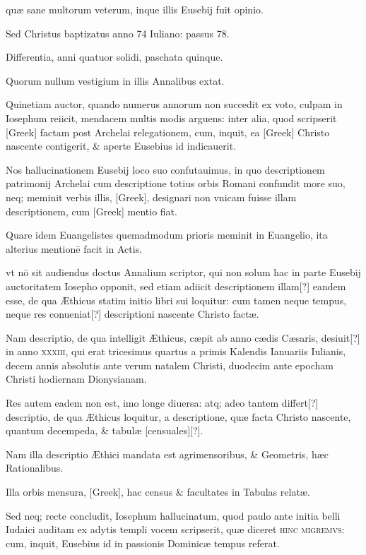 \begin{parnumbers}
quæ sane multorum veterum, inque illis Eusebij fuit opinio.

Sed
Christus baptizatus anno 74 Iuliano: passus 78.

Differentia, anni
quatuor solidi, paschata quinque.

Quorum nullum vestigium in illis
Annalibus extat.

Quinetiam auctor, quando numerus annorum
non succedit ex voto, culpam in Iosephum reiicit, mendacem multis
modis arguens: inter alia, quod scripserit \textgreek{[Greek]} factam post
Archelai relegationem, cum, inquit, ea \textgreek{[Greek]} Christo nascente
contigerit, \& aperte Eusebius id indicauerit.

Nos hallucinationem
Eusebij loco suo confutauimus, in quo descriptionem patrimonij
Archelai cum descriptione totius orbis Romani confundit more
suo, neq; meminit verbis illis, \textgreek{[Greek]}, designari non
vnicam fuisse illam descriptionem, cum \textgreek{[Greek]} mentio fiat.

Quare
idem Euangelistes quemadmodum prioris meminit in Euangelio,
ita alterius mentionē facit in Actis.

vt nō sit audiendus doctus Annalium
scriptor, qui non solum hac in parte Eusebij auctoritatem
Iosepho opponit, sed etiam adiicit descriptionem illam[?] eandem esse,
de qua Æthicus statim initio libri sui loquitur: cum tamen neque
tempus, neque res conueniat[?] descriptioni nascente Christo factæ.

Nam descriptio, de qua intelligit Æthicus, cæpit ab anno cædis
Cæsaris, desiuit[?] in anno \textsc{xxxiii},
 qui erat tricesimus quartus a primis
Kalendis Ianuariis Iulianis, decem annis absolutis ante verum
natalem Christi, duodecim ante epocham Christi hodiernam Dionysianam.

Res autem eadem non est, imo longe diuersa: atq; adeo
tantem differt[?] descriptio, de qua Æthicus loquitur, a descriptione,
quæ facta Christo nascente, quantum decempeda, \& tabulæ [censuales][?].

Nam illa descriptio Æthici mandata est agrimensoribus, \&
Geometris, hæc Rationalibus.

Illa orbis mensura, \textgreek{[Greek]},
hac census \& facultates in Tabulas relatæ.

Sed neq; recte concludit,
Iosephum hallucinatum, quod paulo ante initia belli Iudaici
auditam ex adytis templi vocem scripserit, quæ diceret \textsc{hinc
migremvs}: cum, inquit, Eusebius id in passionis Dominicæ tempus
referat.


\end{parnumbers}

